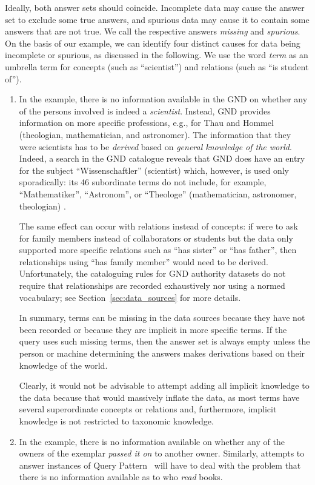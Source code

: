Ideally, both answer sets should coincide.
Incomplete data may cause the answer set to exclude some true answers,
and spurious data may cause it to contain some answers that are not true.
We call the respective answers \emph{missing} and \emph{spurious}.
On the basis of our example, we can identify four distinct causes for data being incomplete or spurious,
as discussed in the following. We use the word \emph{term} as an umbrella term for concepts (such as \enquote{scientist})
and relations (such as \enquote{is student of}).
%
\begin{enumerate}
  \item
    In the example, there is no information available in the GND on whether any of the persons involved is indeed
    a \emph{scientist}. Instead, GND provides information on more specific professions,
    e.g., for Thau and Hommel (theologian, mathematician, and astronomer).
    The information that they were scientists has to be \emph{derived} based on \emph{general knowledge
    of the world}.
    Indeed, a search in the GND catalogue
    reveals that GND does have an entry for the subject \enquote{Wissenschaftler} (scientist) \autocite{GNDScientist}
    which, however, is used only sporadically: its 46 subordinate terms do not include, for example,
    \enquote{Mathematiker}, \enquote{Astronom}, or \enquote{Theologe} (mathematician, astronomer, theologian)  \autocite{GNDScientistSub}.
    
    The same effect can occur with relations instead of concepts:
    if  were to ask for family members instead of collaborators or students
    but the data only supported more specific relations
    such as \enquote{has sister} or \enquote{has father}, then relationships using
    \enquote{has family member} would need to be derived.
    Unfortunately, the cataloguing rules for GND authority datasets do not require
    that relationships are recorded exhaustively nor using a normed vocabulary;
    see Section~\ref{sec:data_sources} for more details.
    
    In summary, terms can be missing in the data sources because
    they have not been recorded or because they are implicit in more specific terms.
    If the query uses such missing terms, then the answer set is always empty
    unless the person or machine determining the answers makes derivations based on their
    knowledge of the world.

    Clearly, it would not be advisable to attempt adding all implicit knowledge to the data
    because that would massively inflate the data,
    as most terms have several superordinate concepts or relations and,
    furthermore, implicit knowledge is not restricted to taxonomic knowledge.
  \item
    In the example, there is no information available on whether any of the owners of the exemplar
    \emph{passed it on} to another owner. Similarly,
    attempts to answer instances of Query Pattern~ will have to deal
    with the problem that there is no information available as to who \emph{read} books.
    

\end{enumerate}

